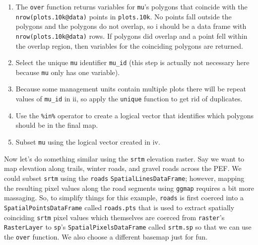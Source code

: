 \documentclass[]{krantz}
\providecommand{\tightlist}{%
  \setlength{\itemsep}{0pt}\setlength{\parskip}{0pt}}
\begin{document}
\begin{enumerate}
\def\labelenumi{\roman{enumi}.}
\tightlist
\item
  The \texttt{over} function returns variables for \texttt{mu}'s
  polygons that coincide with the \texttt{nrow(plots.10k@data)} points
  in \texttt{plots.10k}. No points fall outside the polygons and the
  polygons do not overlap, so i should be a data frame with
  \texttt{nrow(plots.10k@data)} rows. If polygons did overlap and a
  point fell within the overlap region, then variables for the
  coinciding polygons are returned.
\item
  Select the unique \texttt{mu} identifier \texttt{mu\_id} (this step is
  actually not necessary here because \texttt{mu} only has one
  variable).
\item
  Because some management units contain multiple plots there will be
  repeat values of \texttt{mu\_id} in ii, so apply the \texttt{unique}
  function to get rid of duplicates.
\item
  Use the \texttt{\%in\%} operator to create a logical vector that
  identifies which polygons should be in the final map.
\item
  Subset \texttt{mu} using the logical vector created in iv.
\end{enumerate}

Now let's do something similar using the \texttt{srtm} elevation raster.
Say we want to map elevation along trails, winter roads, and gravel
roads across the PEF. We could subset \texttt{srtm} using the
\texttt{roads} \texttt{SpatialLinesDataFrame}; however, mapping the
resulting pixel values along the road segments using \texttt{ggmap}
requires a bit more massaging. So, to simplify things for this example,
\texttt{roads} is first coerced into a \texttt{SpatialPointsDataFrame}
called \texttt{roads.pts} that is used to extract spatially coinciding
\texttt{srtm} pixel values which themselves are coerced from
\texttt{raster}'s \texttt{RasterLayer} to \texttt{sp}'s
\texttt{SpatialPixelsDataFrame} called \texttt{srtm.sp} so that we can
use the \texttt{over} function. We also choose a different basemap just
for fun.
\end{document}
